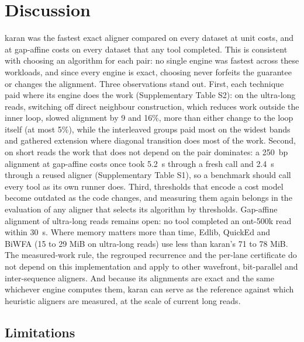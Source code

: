\section{Discussion}

karan was the fastest exact aligner compared on every dataset at unit costs, and at gap-affine costs on every dataset that any tool completed. This is consistent with choosing an algorithm for each pair: no single engine was fastest across these workloads, and since every engine is exact, choosing never forfeits the guarantee or changes the alignment. Three observations stand out. First, each technique paid where its engine does the work (Supplementary Table S2): on the ultra-long reads, switching off direct neighbour construction, which reduces work outside the inner loop, slowed alignment by 9 and 16\%, more than either change to the loop itself (at most 5\%), while the interleaved groups paid most on the widest bands and gathered extension where diagonal transition does most of the work. Second, on short reads the work that does not depend on the pair dominates: a 250~bp alignment at gap-affine costs once took 5.2~\textmu s through a fresh call and 2.4~\textmu s through a reused aligner (Supplementary Table S1), so a benchmark should call every tool as its own runner does. Third, thresholds that encode a cost model become outdated as the code changes, and measuring them again belongs in the evaluation of any aligner that selects its algorithm by thresholds. Gap-affine alignment of ultra-long reads remains open: no tool completed an ont-500k read within 30~s. Where memory matters more than time, Edlib, QuickEd and BiWFA (15 to 29 MiB on ultra-long reads) use less than karan's 71 to 78 MiB. The measured-work rule, the regrouped recurrence and the per-lane certificate do not depend on this implementation and apply to other wavefront, bit-parallel and inter-sequence aligners. And because its alignments are exact and the same whichever engine computes them, karan can serve as the reference against which heuristic aligners are measured, at the scale of current long reads.

\subsection{Limitations}

